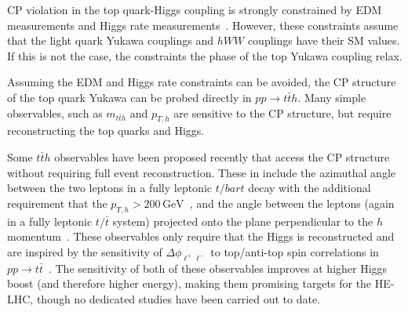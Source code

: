 
CP violation in the top quark-Higgs coupling is strongly constrained by EDM measurements and Higgs rate measurements~\cite{Brod:2013cka}. However, these constraints assume that the light quark Yukawa couplings and $hWW$ couplings have their SM values. If this is not the case, the constraints the phase of the top Yukawa coupling relax.
    
Assuming the EDM and Higgs rate  constraints can be avoided, the CP structure of the top quark Yukawa can be probed directly in $pp \to t\bar t h$. Many simple observables, such as $m_{t\bar t h}$ and $p_{T,h}$ are sensitive to the CP structure, but require reconstructing the top quarks and Higgs.

Some $t\bar t h$ observables have been proposed recently that access the CP structure without requiring full event reconstruction. These in include the azimuthal angle between the two leptons in a fully leptonic $t/bar{t}$ decay with the additional requirement that the $p_{T,h} > 200\, \text{GeV}$~\cite{Buckley:2015vsa}, and the angle between the leptons (again in a fully leptonic $t/\bar t$ system) projected onto the plane perpendicular to the $h$ momentum~\cite{Boudjema:2015nda}. These observables only require that the Higgs is reconstructed and are inspired by the sensitivity of $\Delta \phi_{\ell^+\ell^-}$ to top/anti-top spin correlations in $pp \to t\bar t$~\cite{Mahlon:1995zn}. The sensitivity of both of these observables improves at higher Higgs boost (and therefore higher energy), making them promising targets for the HE-LHC, though no dedicated studies have been carried out to date.